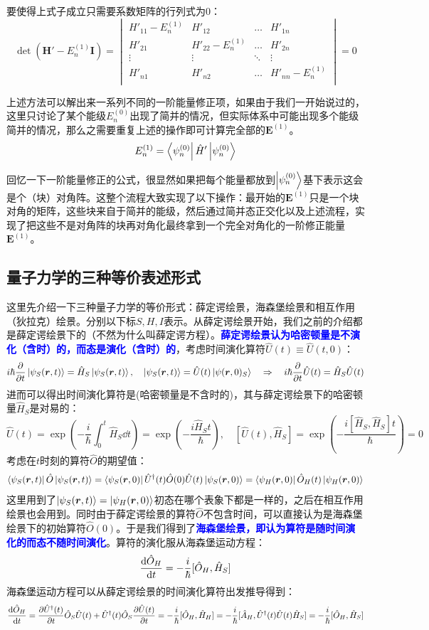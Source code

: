 要使得上式子成立只需要系数矩阵的行列式为0：
\[\det(\mathbf{H}'-E_n^{(1)}\mathbf{I})=\begin{vmatrix}
H'_{11}-E_n^{(1)} & H'_{12} & \ldots & H'_{1n}\\
H'_{21} & H'_{22}-E_n^{(1)} & \ldots & H'_{2n}\\
\vdots & \vdots & \ddots & \vdots\\
H'_{n1} & H'_{n2} & \ldots & H'_{nn}-E_n^{(1)}\\
\end{vmatrix}=0\]

上述方法可以解出来一系列不同的一阶能量修正项，如果由于我们一开始说过的，这里只讨论了某个能级$E_n^{(0)}$出现了简并的情况，但实际体系中可能出现多个能级简并的情况，那么之需要重复上述的操作即可计算完全部的$\mathbf{E}^{(1)}$。
\[E_n^{(1)}=\bra{\psi_n^{(0)}}\hat{H}'\ket{\psi_n^{(0)}}\]

回忆一下一阶能量修正的公式，很显然如果把每个能量都放到$\ket{\psi_{n}^{(0)}}$基下表示这会是个（块）对角阵。这整个流程大致实现了以下操作：最开始的$\mathbf{E}^{(1)}$只是一个块对角的矩阵，这些块来自于简并的能级，然后通过简并态正交化以及上述流程，实现了把这些不是对角阵的块再对角化最终拿到一个完全对角化的一阶修正能量$\mathbf{E}^{(1)}$。

\subsection{量子力学的三种等价表述形式}
这里先介绍一下三种量子力学的等价形式：薛定谔绘景，海森堡绘景和相互作用（狄拉克）绘景。分别以下标$S,H,I$表示。从薛定谔绘景开始，我们之前的介绍都是薛定谔绘景下的（不然为什么叫薛定谔方程）。\textcolor{blue}{\textbf{薛定谔绘景认为哈密顿量是不演化（含时）的，而态是演化（含时）的}}，考虑时间演化算符$\hat{U}(t)\equiv\hat{U}(t,0)$：
\[i\hbar\pdv{t}\ket{\psi_S(\bm{r},t)}=\hat{H}_S\ket{\psi_S(\bm{r},t)}, \quad \ket{\psi_S(\bm{r},t)}=\hat{U}(t)\ket{\psi(\bm{r},0)_S} \quad \Rightarrow \quad i\hbar\pdv{t}\hat{U}(t)=\hat{H}_S\hat{U}(t)\]
进而可以得出时间演化算符是(哈密顿量是不含时的)，其与薛定谔绘景下的哈密顿量$\hat{H}_S$是对易的：
\[\hat{U}(t)=\exp\left(-\frac{i}{\hbar}\int_{0}^{t}\hat{H}_S\dd{t}\right)=\exp\left(-\frac{i\hat{H}_St}{\hbar}\right), \quad [\hat{U}(t),\hat{H}_S]=\exp\left(-\frac{i[\hat{H}_S,\hat{H}_S]t}{\hbar}\right)=0\]
考虑在$t$时刻的算符$\hat{O}$的期望值：
\[\bra{\psi_S(\bm{r},t)}\hat{O}\ket{\psi_S(\bm{r},t)}=\bra{\psi_S(\bm{r},0)}\hat{U}^{\dagger}(t)\hat{O}(0)\hat{U}(t)\ket{\psi_S(\bm{r},0)}=\bra{\psi_H(\bm{r},0)}\hat{O}_H(t)\ket{\psi_H(\bm{r},0)}\]
这里用到了$\ket{\psi_S(\bm{r},t)}=\ket{\psi_H(\bm{r},0)}$初态在哪个表象下都是一样的，之后在相互作用绘景也会用到。同时由于薛定谔绘景的算符$\hat{O}$不包含时间，可以直接认为是海森堡绘景下的初始算符$\hat{O}(0)$。于是我们得到了\textcolor{blue}{\textbf{海森堡绘景，即认为算符是随时间演化的而态不随时间演化}}。算符的演化服从海森堡运动方程：
\[\dv{\hat{O}_H}{t}=-\frac{i}{\hbar}[\hat{O}_H,\hat{H}_S]\]
海森堡运动方程可以从薛定谔绘景的时间演化算符出发推导得到：
\[\dv{\hat{O}_H}{t}=\frac{\partial\hat{U}^{\dagger}(t)}{\partial t}\hat{O}_S\hat{U}(t)+\hat{U}^{\dagger}(t)\hat{O}_S\frac{\partial\hat{U}(t)}{\partial t}=-\frac{i}{\hbar}[\hat{O}_H,\hat{H}_H]=-\frac{i}{\hbar}[\hat{A}_H,\hat{U}^\dagger(t)\hat{U}(t)\hat{H}_S]=-\frac{i}{\hbar}[\hat{O}_H,\hat{H}_S]\]


